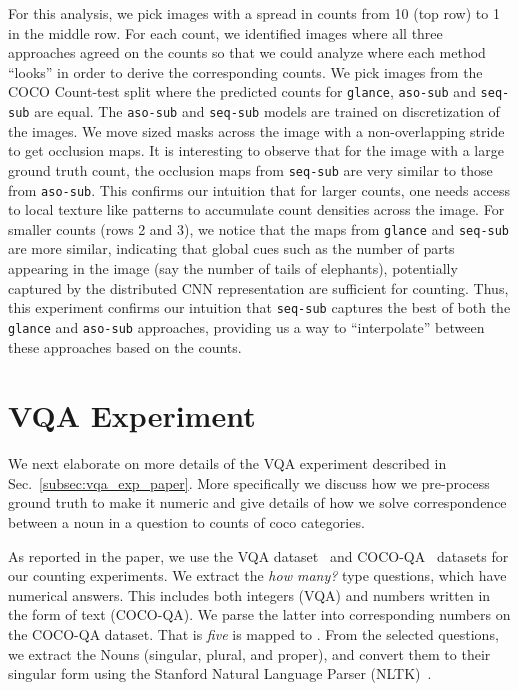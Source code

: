 \documentclass[10pt,twocolumn,letterpaper]{article}
\newcommand{\sub}{\texttt{aso-sub}\xspace}
\newcommand{\seq}{\texttt{seq-sub}\xspace}
\newcommand{\glance}{\texttt{glance}\xspace}
\newcommand{\refsec}[1]{Sec.~\ref{#1}}
\begin{document}
For this analysis, we pick images with a spread in counts from 10 (top row) to 1 in the middle row. For each count, we identified images where all three approaches agreed on the counts so that we could analyze where each method ``looks'' in order to derive the corresponding counts. We pick images from the COCO Count-test split where the predicted counts for \glance, \sub and \seq are equal. The \sub and \seq models are trained on  discretization of the images. We move  sized masks across the image with a non-overlapping stride to get occlusion maps. It is interesting to observe that for the image with a large ground truth count, the occlusion maps from \seq{} are very similar to those from \sub. This confirms our intuition that for larger counts, one needs access to local texture like patterns to accumulate count densities across the image. For smaller counts (rows 2 and 3), we notice that the maps from \glance and \seq are more similar, indicating that global cues such as the number of parts appearing in the image (say the number of tails of elephants), potentially captured by the distributed CNN representation are sufficient for counting. Thus, this experiment confirms our intuition that \seq captures the best of both the \glance{} and \sub{} approaches, providing us a way to ``interpolate'' between these approaches based on the counts.



 
\section{VQA Experiment}\label{sec:vqa_exp}
We next elaborate on more details of the VQA experiment described in \refsec{subsec:vqa_exp_paper}. More specifically we discuss how we pre-process ground truth to make it numeric and give details of how we solve correspondence between a noun in a question to counts of coco categories.

As reported in the paper, we use the  VQA dataset~\cite{vqa} and COCO-QA~\cite{Ren2015ExploringAnswering} datasets for our counting experiments. We extract the \emph{how many?} type questions, which have numerical answers. This includes both integers (VQA) and numbers written in the form of text (COCO-QA). We parse the latter into corresponding numbers on the COCO-QA dataset. That is \emph{five} is mapped to . From the selected questions, we extract the Nouns (singular, plural, and proper), and convert them to their singular form using the Stanford Natural Language Parser (NLTK)~\cite{nltk}.
\end{document}
